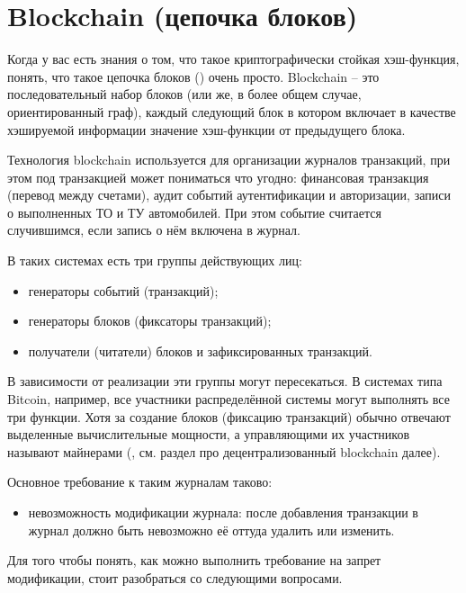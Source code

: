 \section{Blockchain (цепочка блоков)}\label{section-blockchain}

Когда у вас есть знания о том, что такое криптографически стойкая хэш-функция, понять, что такое цепочка блоков () очень просто. Blockchain -- это последовательный набор блоков (или же, в более общем случае, ориентированный граф), каждый следующий блок в котором включает в качестве хэшируемой информации значение хэш-функции от предыдущего блока.

Технология blockchain используется для организации журналов транзакций, при этом под транзакцией может пониматься что угодно: финансовая транзакция (перевод между счетами), аудит событий аутентификации и авторизации, записи о выполненных ТО и ТУ автомобилей. При этом событие считается случившимся, если запись о нём включена в журнал.

В таких системах есть три группы действующих лиц:

\begin{itemize}
	\item генераторы событий (транзакций);
	\item генераторы блоков (фиксаторы транзакций);
	\item получатели (читатели) блоков и зафиксированных транзакций.
\end{itemize}

В зависимости от реализации эти группы могут пересекаться. В системах типа Bitcoin, например, все участники распределённой системы могут выполнять все три функции. Хотя за создание блоков (фиксацию транзакций) обычно отвечают выделенные вычислительные мощности, а управляющими их участников называют майнерами (, см. раздел про децентрализованный blockchain далее).

Основное требование к таким журналам таково:

\begin{itemize}
	\item невозможность модификации журнала: после добавления транзакции в журнал должно быть невозможно её оттуда удалить или изменить.
\end{itemize}

Для того чтобы понять, как можно выполнить требование на запрет модификации, стоит разобраться со следующими вопросами.

